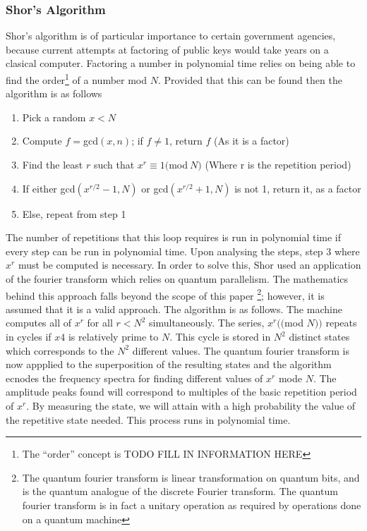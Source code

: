 \documentclass[12pt]{article}
\begin{document}
\subsubsection{Shor's Algorithm}
Shor's algorithm is of particular importance to certain government agencies, because current attempts at factoring of public keys would take years on a clasical computer. Factoring a number in polynomial time relies on being able to find the order\footnote{The ``order'' concept is TODO FILL IN INFORMATION HERE} of a number mod $N$.\cite{cis4930} Provided that this can be found then the algorithm is as follows
\begin{enumerate}
\item Pick a random $x<N$
\item Compute $f = $gcd$(x, n)$; if $f\neq 1$, return $f$ (As it is a factor)
\item Find the least $r$ such that $x^r\equiv 1 ($mod$\:N)$ (Where r is the repetition period)
\item If either gcd$(x^{r/2}-1, N)$ or gcd$(x^{r/2}+1, N)$ is not 1, return it, as a factor
\item Else, repeat from step 1
\end{enumerate}
The number of repetitions that this loop requires is run in polynomial time if every step can be run in polynomial time. Upon analysing the steps, step 3 where $x^r$ must be computed is necessary. In order to solve this, Shor used an application of the fourier transform which relies on quantum parallelism. The mathematics behind this approach falls beyond the scope of this paper
\footnote{The quantum fourier transform is linear transformation on quantum bits, and is the quantum analogue of the discrete Fourier transform. The quantum fourier transform is in fact a unitary operation as required by operations done on a quantum machine}; however, it is assumed that it is a valid approach. The algorithm is as follows. The machine computes all of $x^r$ for all $r<N^2$ simultaneously. The series, $x^r(($mod $N))$ repeats in cycles if $x4$ is relatively prime to $N$. This cycle is stored in $N^2$ distinct states which corresponds to the $N^2$ different values. The quantum fourier transform is now appplied to the superposition of the resulting states and the algorithm ecnodes the frequency spectra for finding different values of $x^r$ mode $N$. The amplitude peaks found will correspond to multiples of the basic repetition period of $x^r$. By measuring the state, we will attain with a high probability the value of the repetitive state needed. This process runs in polynomial time. \cite{cis4930}
\end{document}
